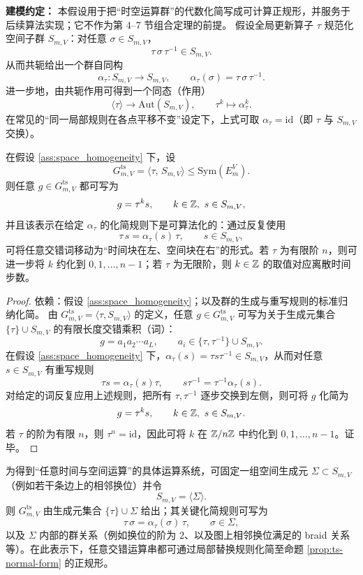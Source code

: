 \begin{assumption}[空间齐性与正规化规则]\label{ass:space_homogeneity}
\InterfaceTag \textbf{建模约定：} 本假设用于把“时空运算群”的代数化简写成可计算正规形，并服务于后续算法实现；它不作为第 4--7 节组合定理的前提。
假设全局更新算子 $\tau$ 规范化空间子群 $S_{m,V}$：对任意 $\sigma\in S_{m,V}$，
$$
\tau\,\sigma\,\tau^{-1}\in S_{m,V}.
$$
从而共轭给出一个群自同构
$$
\alpha_\tau:S_{m,V}\to S_{m,V},\qquad \alpha_\tau(\sigma)=\tau\,\sigma\,\tau^{-1}.
$$
进一步地，由共轭作用可得到一个同态（作用）
$$
\langle\tau\rangle\to \mathrm{Aut}(S_{m,V}),\qquad \tau^k\mapsto \alpha_\tau^k.
$$
在常见的“同一局部规则在各点平移不变”设定下，上式可取 $\alpha_\tau=\mathrm{id}$（即 $\tau$ 与 $S_{m,V}$ 交换）。
\end{assumption}

\begin{proposition}[时空运算的正规形]\label{prop:ts-normal-form}
在假设 \ref{ass:space_homogeneity} 下，设
$$
G_{m,V}^{\mathrm{ts}}=\langle \tau,\, S_{m,V}\rangle \le \mathrm{Sym}(E_m^V).
$$
则任意 $g\in G_{m,V}^{\mathrm{ts}}$ 都可写为
$$
g=\tau^k s,\qquad k\in\mathbb{Z},\ s\in S_{m,V},
$$
并且该表示在给定 $\alpha_\tau$ 的化简规则下是可算法化的：通过反复使用
$$
\tau\, s=\alpha_\tau(s)\,\tau,\qquad s\in S_{m,V},
$$
可将任意交错词移动为“时间块在左、空间块在右”的形式。若 $\tau$ 为有限阶 $n$，则可进一步将 $k$ 约化到 $0,1,\dots,n-1$；若 $\tau$ 为无限阶，则 $k\in\mathbb{Z}$ 的取值对应离散时间步数。
\end{proposition}

\begin{proof}
\MathTag 依赖：假设 \ref{ass:space_homogeneity}；以及群的生成与重写规则的标准归纳化简。
由 $G_{m,V}^{\mathrm{ts}}=\langle \tau, S_{m,V}\rangle$ 的定义，任意 $g\in G_{m,V}^{\mathrm{ts}}$ 可写为关于生成元集合 $\{\tau\}\cup S_{m,V}$ 的有限长度交错乘积（词）：
$$
g = a_1 a_2 \cdots a_L,\qquad a_i\in \{\tau,\tau^{-1}\}\cup S_{m,V}.
$$
在假设 \ref{ass:space_homogeneity} 下，$\alpha_\tau(s)=\tau s\tau^{-1}\in S_{m,V}$，从而对任意 $s\in S_{m,V}$ 有重写规则
$$
\tau s = \alpha_\tau(s)\tau,\qquad
s\tau^{-1}=\tau^{-1}\alpha_\tau(s).
$$
对给定的词反复应用上述规则，把所有 $\tau,\tau^{-1}$ 逐步交换到左侧，则可将 $g$ 化简为
$$
g=\tau^k s,\qquad k\in\mathbb{Z},\ s\in S_{m,V}.
$$
若 $\tau$ 的阶为有限 $n$，则 $\tau^n=\mathrm{id}$，因此可将 $k$ 在 $\mathbb{Z}/n\mathbb{Z}$ 中约化到 $0,1,\dots,n-1$。证毕。
\end{proof}

\begin{remark}\label{rem:generators-relations}
为得到“任意时间与空间运算”的具体运算系统，可固定一组空间生成元 $\Sigma\subset S_{m,V}$（例如若干条边上的相邻换位）并令
$$
S_{m,V}=\langle \Sigma\rangle.
$$
则 $G_{m,V}^{\mathrm{ts}}$ 由生成元集合 $\{\tau\}\cup\Sigma$ 给出；其关键化简规则可写为
$$
\tau\,\sigma=\alpha_\tau(\sigma)\,\tau,\qquad \sigma\in \Sigma,
$$
以及 $\Sigma$ 内部的群关系（例如换位的阶为 $2$、以及图上相邻换位满足的 braid 关系等）。在此表示下，任意交错运算串都可通过局部替换规则化简至命题 \ref{prop:ts-normal-form} 的正规形。
\end{remark}

